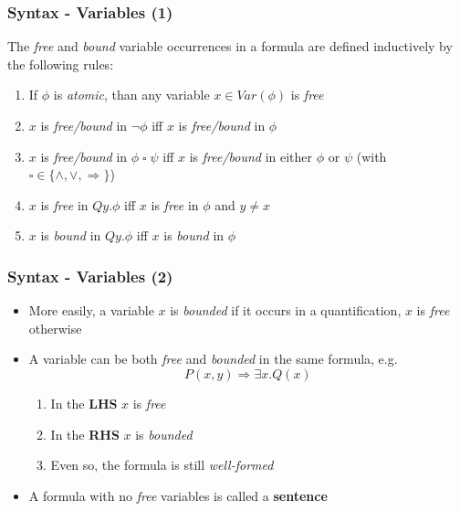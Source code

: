\documentclass{beamer}
\begin{document}
                \begin{frame}
                    \frametitle{Syntax - Variables (1)}
                    \begin{definition}
                        The \textit{free} and \textit{bound} variable occurrences in a formula are defined inductively by the following rules:
                        \begin{enumerate}
                            \item If $ \phi $ is \textit{atomic}, than any variable $ x \in Var(\phi) $ is \textit{free}
                            \item $ x $ is \textit{free/bound} in $ \neg \phi $ iff $ x $ is \textit{free/bound} in $ \phi $
                            \item $ x $ is \textit{free/bound} in $ \phi\; \square\; \psi $ iff $ x $ is \textit{free/bound} in either $ \phi $ or $ \psi $ (with $ \square \in \{ \wedge, \vee, \Rightarrow \} $)
                            \item $ x $ is \textit{free} in $ Qy.\phi $ iff $ x $ is \textit{free} in $ \phi $ and $ y \neq x $
                            \item $ x $ is \textit{bound} in $ Qy.\phi $ iff $ x $ is \textit{bound} in $ \phi $
                        \end{enumerate}
                    \end{definition}
                \end{frame}

                \begin{frame}
                    \frametitle{Syntax - Variables (2)}
                    \begin{itemize}
                        \item More easily, a variable $ x $ is \textit{bounded} if it occurs in a quantification, $ x $ is \textit{free} otherwise
                        \item A variable can be both \textit{free} and \textit{bounded} in the same formula, e.g.
                        \[
                            P(x, y) \Rightarrow \exists x.Q(x)    
                        \]
                        \begin{enumerate}
                            \item In the \textbf{LHS} $ x $ is \textit{free}
                            \item In the \textbf{RHS} $ x $ is \textit{bounded}
                            \item Even so, the formula is still \textit{well-formed}
                        \end{enumerate}
                        \item A formula with no \textit{free} variables is called a \textbf{sentence}
                    \end{itemize}
                \end{frame}
\end{document}
